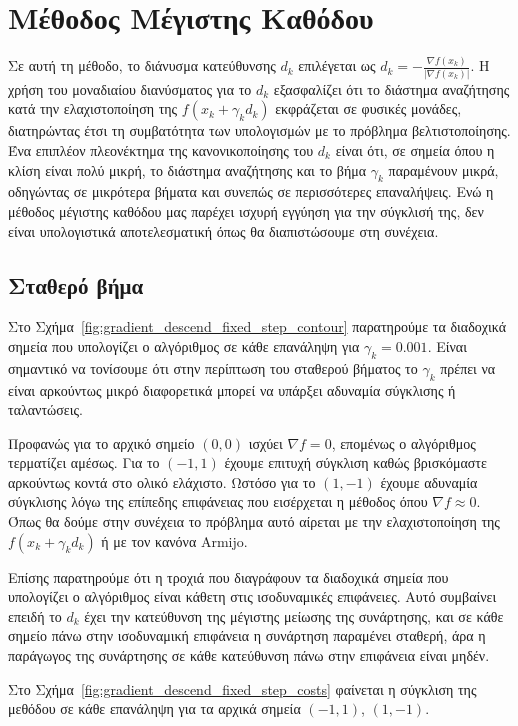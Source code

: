 \documentclass[a4paper,12pt]{article}
\begin{document}
\section*{Μέθοδος Μέγιστης Καθόδου}
Σε αυτή τη μέθοδο, το διάνυσμα κατεύθυνσης $d_k$ επιλέγεται ως $d_k = -\frac{\nabla f(x_k)}{|\nabla f(x_k)|}$.
Η χρήση του μοναδιαίου διανύσματος για το $d_k$ εξασφαλίζει ότι το διάστημα αναζήτησης κατά την ελαχιστοποίηση της $f(x_k + \gamma_k d_k)$ εκφράζεται σε φυσικές μονάδες, διατηρώντας έτσι τη συμβατότητα των υπολογισμών με το 
πρόβλημα βελτιστοποίησης. Ένα επιπλέον πλεονέκτημα της κανονικοποίησης του $d_k$ είναι ότι, σε σημεία όπου η 
κλίση είναι πολύ μικρή, το διάστημα αναζήτησης και το βήμα $\gamma_k$ παραμένουν μικρά, οδηγώντας σε μικρότερα 
βήματα και συνεπώς σε περισσότερες επαναλήψεις. Ενώ η μέθοδος μέγιστης καθόδου μας παρέχει ισχυρή εγγύηση για την
σύγκλισή της, δεν είναι υπολογιστικά αποτελεσματική όπως θα διαπιστώσουμε στη συνέχεια.

\subsection*{Σταθερό βήμα}
Στο Σχήμα~\ref{fig:gradient_descend_fixed_step_contour} παρατηρούμε τα διαδοχικά σημεία που υπολογίζει ο αλγόριθμος
σε κάθε επανάληψη για $\gamma_k = 0.001$. Είναι σημαντικό να τονίσουμε ότι στην περίπτωση του σταθερού βήματος 
το $\gamma_k$ πρέπει να είναι αρκούντως μικρό διαφορετικά μπορεί να υπάρξει αδυναμία σύγκλισης ή ταλαντώσεις.

Προφανώς για το αρχικό σημείο $(0,0)$ ισχύει $\nabla f = 0$, επομένως ο αλγόριθμος τερματίζει αμέσως.
Για το $(-1, 1)$ έχουμε επιτυχή σύγκλιση καθώς βρισκόμαστε αρκούντως κοντά στο ολικό ελάχιστο. Ωστόσο για το
$(1, -1)$ έχουμε αδυναμία σύγκλισης λόγω της επίπεδης επιφάνειας που εισέρχεται η μέθοδος όπου $\nabla f \approx 0$.
Όπως θα δούμε στην συνέχεια το πρόβλημα αυτό αίρεται με την ελαχιστοποίηση της $f(x_k + \gamma_k d_k)$ ή 
με τον κανόνα  Armijo.

 Επίσης παρατηρούμε ότι η τροχιά που
διαγράφουν τα διαδοχικά σημεία που υπολογίζει ο αλγόριθμος είναι κάθετη στις ισοδυναμικές επιφάνειες. Αυτό
συμβαίνει επειδή το $d_k$ έχει την κατεύθυνση της μέγιστης μείωσης της συνάρτησης, και σε κάθε σημείο πάνω στην 
ισοδυναμική επιφάνεια η συνάρτηση παραμένει σταθερή, άρα η παράγωγος της συνάρτησης σε κάθε κατεύθυνση πάνω στην
επιφάνεια είναι μηδέν. 

Στο Σχήμα~\ref{fig:gradient_descend_fixed_step_costs} φαίνεται η σύγκλιση της μεθόδου
σε κάθε επανάληψη για τα αρχικά σημεία $(-1, 1)$, $(1, -1)$.
\end{document}
